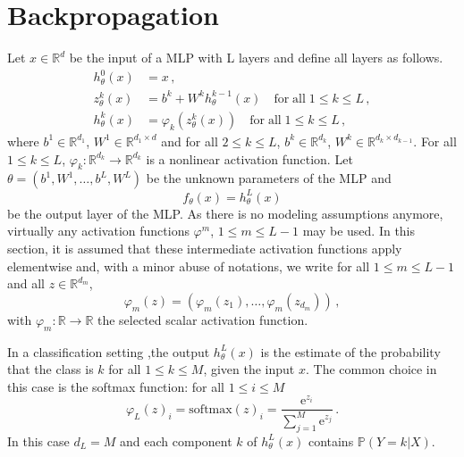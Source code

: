 \documentclass[a4paper,10pt,fleqn]{article}
\newcommand{\eqsp}{\,}
\newcommand{\rset}{\ensuremath{\mathbb{R}}}
\newcommand{\rme}{\ensuremath{\mathrm{e}}}
\newcommand{\1}{\ensuremath{\mathbbm{1}}}
\begin{document}
\section{Backpropagation}
Let $x\in\rset^d$ be the input of a MLP with L layers and define all layers as follows.
\begin{align*}
h_{\theta}^0(x) &= x\eqsp,\\
z_{\theta}^k(x)  &= b^k + W^kh_{\theta}^{k-1}(x)\quad \mathrm{for\;all\;} 1\leqslant k\leqslant L\eqsp,\\
h_{\theta}^k(x)  &= \varphi_k(z_{\theta}^{k}(x))\quad \mathrm{for\;all\;}1\leqslant k\leqslant L\eqsp,
\end{align*}
where $b^1\in\rset^{d_1}$, $W^1\in\rset^{d_1\times d}$ and for all $2\leqslant k\leqslant L$, $b^k\in\rset^{d_k}$, $W^k\in\rset^{d_k\times d_{k-1}}$. For all $1\leqslant k\leqslant L$, $\varphi_k: \rset^{d_k} \to \rset^{d_k}$ is a nonlinear activation function. Let $\theta = (b^1,W^1,\ldots,b^L,W^L)$ be the unknown parameters of the MLP and 
$$
f_{\theta}(x) = h_{\theta}^L(x)
$$
 be the output layer of the MLP. As there is no modeling assumptions anymore, virtually any activation functions $\varphi^m$, $1\leqslant m\leqslant L-1$ may be used. In this section, it is assumed that these intermediate activation functions apply elementwise and, with a minor abuse of notations, we write for all $1\leqslant m\leqslant L-1$ and all $z\in\rset^{d_m}$,
$$
\varphi_m(z) = (\varphi_m(z_1),\ldots, \varphi_m(z_{d_m}))\eqsp,
$$
with $\varphi_m: \rset\to \rset$ the selected scalar activation function. 

In a classification setting ,the output $h_{\theta}^L(x)$ is the estimate of the probability that the class is  $k$ for all $1\leqslant k\leqslant M$, given the input $x$. The common choice in this case is the softmax function: for all $1\leqslant i\leqslant M$
$$
\varphi_L(z)_i = \mathrm{softmax}(z)_i = \frac{\rme^{z_i}}{\sum_{j=1}^M\rme^{z_j}}\eqsp.
$$
In this case $d_L = M$ and each component $k$ of $h_{\theta}^L(x)$ contains $\mathbb{P}(Y=k | X)$.
\end{document}
